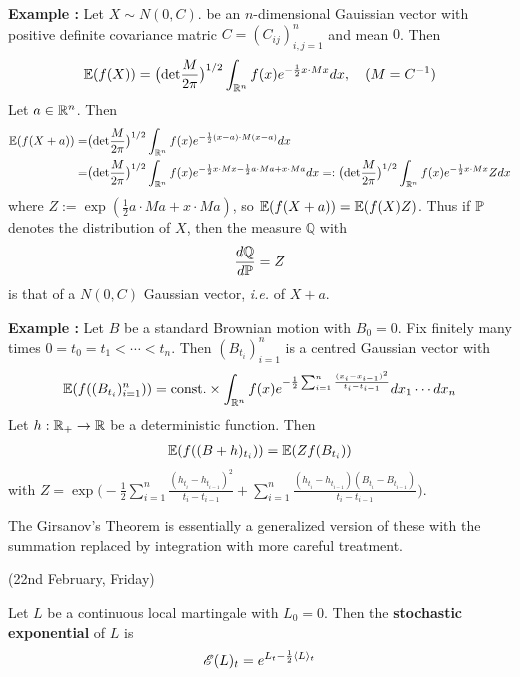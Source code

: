 \documentclass[10pt,a4paper]{article}
\begin{document}
\textbf{Example :} Let $X\sim N(0, C)$. be an $n$-dimensional Gauissian vector with positive definite covariance matric $C= (C_{ij})_{i,j=1}^n$ and mean $0$. Then
\begin{align*}
\mathbb{E} (f(X)) = \big( \text{det} \frac{M}{2\pi} \big)^{1/2} \int_{\mathbb{R}^n} f(x) e^{-\frac{1}{2} x\cdot M x} dx, \quad (M = C^{-1})
\end{align*}
Let $a\in \mathbb{R}^n$. Then 
\begin{align*}
\mathbb{E} (f(X+a)) =& \big( \text{det} \frac{M}{2\pi} \big)^{1/2} \int_{\mathbb{R}^n} f(x) e^{-\frac{1}{2} (x-a)\cdot M (x-a)} dx \\
=& \big( \text{det} \frac{M}{2\pi} \big)^{1/2} \int_{\mathbb{R}^n} f(x) e^{- \frac{1}{2} x\cdot Mx - \frac{1}{2} a\cdot Ma + x\cdot M a} dx =: \big( \text{det} \frac{M}{2\pi} \big)^{1/2} \int_{\mathbb{R}^n} f(x) e^{- \frac{1}{2} x\cdot Mx} Z dx
\end{align*}
where $Z := \exp (\frac{1}{2} a\cdot Ma + x\cdot M a)$, so $\mathbb{E} (f(X+a)) = \mathbb{E} (f(X) Z)$. Thus if $\mathbb{P}$ denotes the distribution of $X$, then the measure $\mathbb{Q}$ with
\begin{align*}
\frac{d\mathbb{Q}}{d\mathbb{P}} = Z
\end{align*}
is that of a $N(0, C)$ Gaussian vector, \textit{i.e.} of $X+a$.
\s

\textbf{Example :} Let $B$ be a standard Brownian motion with $B_0 =0$. Fix finitely many times $0=t_0 = t_1 < \cdots < t_n$. Then $(B_{t_i})_{i=1}^n$ is a centred Gaussian vector with
\begin{align*}
\mathbb{E} (f((B_{t_i})_{i=1}^n)) = \text{const.} \times \int_{\mathbb{R}^n} f(x)e^{-\frac{1}{2} \sum_{i=1}^n \frac{(x_i - x_{i-1})^2}{t_i -t_{i-1}}} dx_1 \cdots dx_n 
\end{align*}
Let $h: \mathbb{R}_+ \rightarrow \mathbb{R}$ be a deterministic function. Then
\begin{align*}
\mathbb{E} (f((B + h)_{t_i})) = \mathbb{E}(Z f(B_{t_i}))
\end{align*}
with $Z= \exp \big( -\frac{1}{2}\sum_{i=1}^n \frac{(h_{t_i} - h_{t_{i-1}})^2}{t_i - t_{i-1}} + \sum_{i=1}^n \frac{(h_{t_i} - h_{t_{i-1}})(B_{t_i} - B_{t_{i-1}})}{t_i - t_{i-1}} \big)$.
\s

The Girsanov's Theorem is essentially a generalized version of these with the summation replaced by integration with more careful treatment.
\s

\newday

(22nd February, Friday)
\s

 Let $L$ be a continuous local martingale with $L_0 =0$. Then the \textbf{stochastic exponential} of $L$ is
\begin{align*}
\mathscr{E} (L)_t = e^{L_t - \frac{1}{2} \langle L \rangle_t}
\end{align*}
\end{document}
